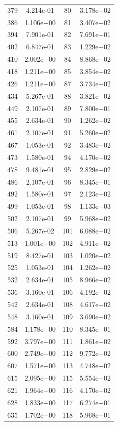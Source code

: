 \documentclass[12pt]{article}
\begin{document}
\begin{longtable}{@{}cccc@{}}
379 & 4.214e-01 & 80 & 3.178e+02 \\
386 & 1.106e+00 & 81 & 3.407e+02 \\
394 & 7.901e-01 & 82 & 7.691e+01 \\
402 & 6.847e-01 & 83 & 1.229e+02 \\
410 & 2.002e+00 & 84 & 8.868e+02 \\
418 & 1.211e+00 & 85 & 3.854e+02 \\
426 & 1.211e+00 & 87 & 3.734e+02 \\
434 & 5.267e-01 & 88 & 3.821e+02 \\
449 & 2.107e-01 & 89 & 7.800e+01 \\
455 & 2.634e-01 & 90 & 1.262e+02 \\
461 & 2.107e-01 & 91 & 5.260e+02 \\
467 & 1.053e-01 & 92 & 3.483e+02 \\
473 & 1.580e-01 & 94 & 4.170e+02 \\
478 & 9.481e-01 & 95 & 2.829e+02 \\
486 & 2.107e-01 & 96 & 8.345e+01 \\
492 & 1.580e-01 & 97 & 2.123e+02 \\
499 & 1.053e-01 & 98 & 1.133e+03 \\
502 & 2.107e-01 & 99 & 5.968e+02 \\
506 & 5.267e-02 & 101 & 6.088e+02 \\
513 & 1.001e+00 & 102 & 4.911e+02 \\
519 & 8.427e-01 & 103 & 1.020e+02 \\
525 & 1.053e-01 & 104 & 1.262e+02 \\
532 & 2.634e-01 & 105 & 8.966e+02 \\
536 & 3.160e-01 & 106 & 4.192e+02 \\
542 & 2.634e-01 & 108 & 4.617e+02 \\
548 & 3.160e-01 & 109 & 3.690e+02 \\
584 & 1.178e+00 & 110 & 8.345e+01 \\
592 & 3.797e+00 & 111 & 1.861e+02 \\
600 & 2.749e+00 & 112 & 9.772e+02 \\
607 & 1.571e+00 & 113 & 4.748e+02 \\
615 & 2.095e+00 & 115 & 5.554e+02 \\
621 & 1.964e+00 & 116 & 4.170e+02 \\
628 & 1.833e+00 & 117 & 6.274e+01 \\
635 & 1.702e+00 & 118 & 5.968e+01 \\

\end{longtable}
\end{document}
